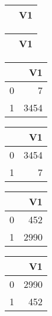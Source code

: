 \bigskip\bigskip
\centering
\begin{tabular}{rr}
  \hline
 & V1 \\ 
  \hline
\hline
\end{tabular}

\bigskip\bigskip
\centering
\begin{tabular}{rr}
  \hline
 & V1 \\ 
  \hline
\hline
\end{tabular}

\bigskip\bigskip
\centering
\begin{tabular}{rr}
  \hline
 & V1 \\ 
  \hline
0 &   7 \\ 
  1 & 3454 \\ 
   \hline
\end{tabular}

\bigskip\bigskip
\centering
\begin{tabular}{rr}
  \hline
 & V1 \\ 
  \hline
0 & 3454 \\ 
  1 &   7 \\ 
   \hline
\end{tabular}

\bigskip\bigskip
\centering
\begin{tabular}{rr}
  \hline
 & V1 \\ 
  \hline
0 & 452 \\ 
  1 & 2990 \\ 
   \hline
\end{tabular}

\bigskip\bigskip
\centering
\begin{tabular}{rr}
  \hline
 & V1 \\ 
  \hline
0 & 2990 \\ 
  1 & 452 \\ 
   \hline
\end{tabular}

